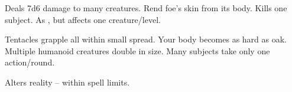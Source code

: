 \begin{swspelllist}
   Deals 7d6 damage to many creatures.
   Rend foe's skin from its body.
   Kills one subject.
   As , but affects one creature/level.

   Tentacles grapple all within small spread.
   Your body becomes as hard as oak.
   Multiple humanoid creatures double in size.
   Many subjects take only one action/round.

  \M Alters reality -- within spell limits.
\end{swspelllist}

